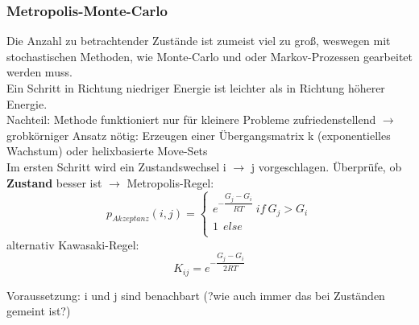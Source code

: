 \subsubsection{Metropolis-Monte-Carlo}
Die Anzahl zu betrachtender Zustände ist zumeist viel zu groß, weswegen mit stochastischen Methoden, wie Monte-Carlo und oder Markov-Prozessen gearbeitet werden muss. \\
Ein Schritt in Richtung niedriger Energie ist leichter als in Richtung höherer Energie. \\ 
Nachteil: Methode funktioniert nur für kleinere Probleme zufriedenstellend $\rightarrow$ grobkörniger Ansatz nötig: Erzeugen einer Übergangsmatrix k (exponentielles Wachstum) oder helixbasierte Move-Sets \\
Im ersten Schritt wird ein Zustandswechsel i $\rightarrow$ j vorgeschlagen. Überprüfe, ob \textbf{Zustand} besser ist $\rightarrow$ Metropolis-Regel: \\
\begin{equation}
p_{Akzeptanz}(i,j) =
\begin{cases}
e^{-\dfrac{G_j - G_i}{RT}} \ if \ G_j > G_i \\ 1 \ \ else \\
\end{cases}
\end{equation}
alternativ Kawasaki-Regel: \\
\begin{equation}
K_{ij} = e^{-\dfrac{G_j - G_i}{2RT}}
\end{equation}

Voraussetzung: i und j sind benachbart (?wie auch immer das bei Zuständen gemeint ist?)

